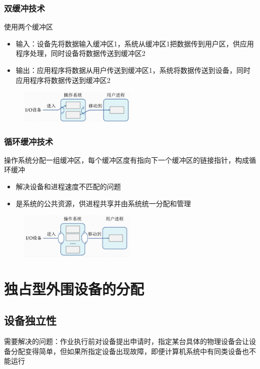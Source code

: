 \documentclass[cs4size,a4paper,10pt]{ctexart}
\begin{document}
	\subsubsection{双缓冲技术}
	使用两个缓冲区
	\begin{itemize}
		\item 输入：设备先将数据输入缓冲区1，系统从缓冲区1把数据传到用户区，供应用程序处理，同时设备将数据传送到缓冲区2
		\item 输出：应用程序将数据从用户传送到缓冲区1，系统将数据传送到设备，同时应用程序将数据传送到缓冲区2
	\end{itemize}
	\begin{figure}[H]
		\centering
		\includegraphics[width=0.5\textwidth]{img/4.2.4.3}
	\end{figure}

	\subsubsection{循环缓冲技术}
	操作系统分配一组缓冲区，每个缓冲区度有指向下一个缓冲区的链接指针，构成循环缓冲
	\begin{itemize}
		\item 解决设备和进程速度不匹配的问题
		\item 是系统的公共资源，供进程共享并由系统统一分配和管理
	\end{itemize}
	\begin{figure}[H]
		\centering
		\includegraphics[width=0.5\textwidth]{img/4.2.4.4}
	\end{figure}

	\section{独占型外围设备的分配}
	\subsection{设备独立性}
	需要解决的问题：作业执行前对设备提出申请时，指定某台具体的物理设备会让设备分配变得简单，但如果所指定设备出现故障，即便计算机系统中有同类设备也不能运行
\end{document}

